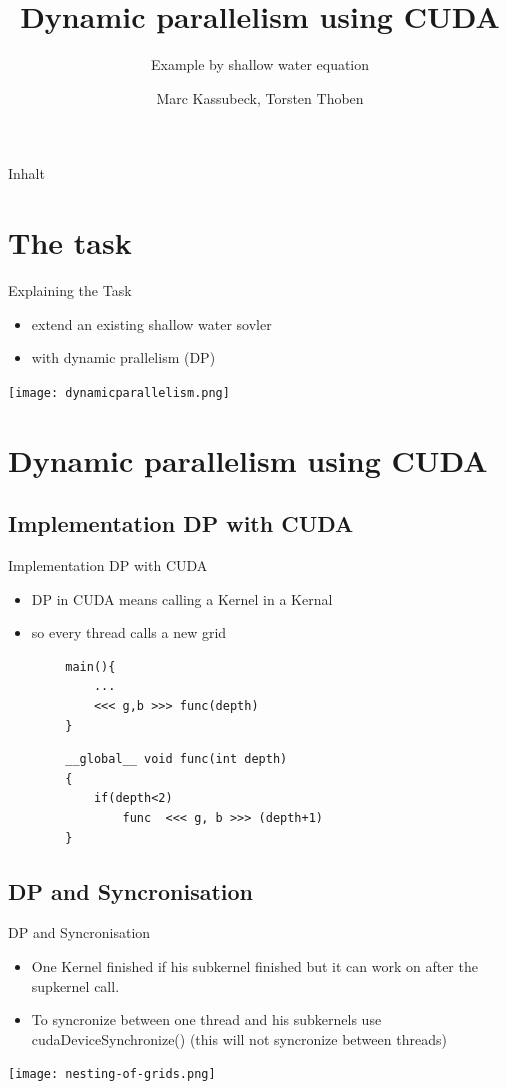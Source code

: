 \documentclass[fleqn,11pt,aspectratio=43]{beamer}
\title{Dynamic parallelism using CUDA}
\subtitle{Example by shallow water equation}
\author{Marc Kassubeck, Torsten Thoben}
\begin{document}
\begin{frame}[plain]
\titlepage
\end{frame}

\begin{frame}{Inhalt}
\tableofcontents
\end{frame}


\section{The task}
\begin{frame}{Explaining the Task}
	\begin{itemize}
		\item extend an existing shallow water sovler
		\item with dynamic prallelism (DP)
	\end{itemize}
	\centering
	\texttt{[image: dynamicparallelism.png]}
\end{frame}

\section{Dynamic parallelism using CUDA}

\subsection{Implementation DP with CUDA}	
\begin{frame}[fragile]{Implementation DP with CUDA}
	\begin{itemize}
		\item DP in CUDA means calling a Kernel in a Kernal
		\item so every thread calls a new grid
	\end{itemize}

	\begin{verbatim}
		main(){
		    ...
		    <<< g,b >>> func(depth)
		}
	\end{verbatim}	

	\begin{verbatim}
		__global__ void func(int depth)
		{
		    if(depth<2)
		        func  <<< g, b >>> (depth+1)
		}
	\end{verbatim}
\end{frame}

\subsection{DP and Syncronisation}
\begin{frame}{DP and Syncronisation}
	\begin{itemize}
		\item One Kernel finished if his subkernel finished but it can work on after the supkernel call.
		\item To syncronize between one thread and his subkernels use cudaDeviceSynchronize() (this will not syncronize between threads)
	\end{itemize}
	\centering
	\texttt{[image: nesting-of-grids.png]}
\end{frame}
\end{document}
